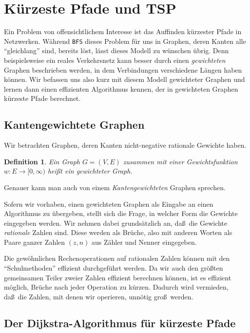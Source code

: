 \documentclass[10pt,reqno]{amsart}
\numberwithin{equation}{section}
\newtheorem{definition}{Definition}[section]
\begin{document}
\section{K\"urzeste Pfade und TSP}\label{sec_shortest_path}

\noindent
Ein Problem von offensichtlichem Interesse ist das Auffinden k\"urzester Pfade in Netzwerken.
W\"ahrend {\tt BFS} dieses Problem f\"ur uns in Graphen, deren Kanten alle ``gleichlang'' sind, bereits l\"ost, l\"asst dieses Modell zu w\"unschen \"ubrig.
Denn beispielsweise ein reales Verkehrsnetz kann besser durch einen {\em gewichteten} Graphen beschrieben werden, in dem Verbindungen verschiedene L\"angen haben k\"onnen.
Wir befassen uns also kurz mit diesem Modell gewichteter Graphen und lernen dann einen effizienten Algorithmus kennen, der in gewichteten Graphen k\"urzeste Pfade berechnet.

\subsection{Kantengewichtete Graphen}\label{sec_weighted}
Wir betrachten Graphen, deren Kanten nicht-negative rationale Gewichte haben.

\begin{definition}\label{deg_weighted}
	Ein Graph $G=(V,E)$ zusammen mit einer Gewichtsfunktion $w:E\to[0,\infty)$ hei\ss t ein {\em gewichteter Graph}.
\end{definition}

\noindent
Genauer kann man auch von einem {\em Kantengewichteten} Graphen sprechen.

Sofern wir vorhaben, einen gewichteten Graphen als Eingabe an einen Algorithmus zu \"ubergeben, stellt sich die Frage, in welcher Form die Gewichte eingegeben werden.
Wir nehmen dabei grunds\"atzlich an, da\ss\ die Gewichte {\em rationale} Zahlen sind.
Diese werden als Br\"uche, also mit anderen Worten als Paare ganzer Zahlen $(z,n)$ aus Z\"ahler und Nenner eingegeben.

Die gew\"ohnlichen Rechenoperationen auf rationalen Zahlen k\"onnen mit den ``Schulmethoden'' effizient durchgef\"uhrt werden.
Da wir auch den gr\"o\ss ten gemeinsamen Teiler zweier Zahlen effizient berechnen k\"onnen, ist es effizient m\"oglich, Br\"uche nach jeder Operation zu k\"urzen.
Dadurch wird vermieden, da\ss\ die Zahlen, mit denen wir operieren, unn\"otig gro\ss\ werden.

\subsection{Der Dijkstra-Algorithmus f\"ur k\"urzeste Pfade}\label{sec_dijkstra}
\end{document}
